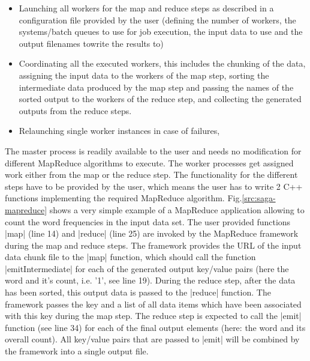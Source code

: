 \documentclass[conference,final]{IEEEtran}
\begin{document}
\begin{itemize}
\item Launching all workers for the map and reduce steps as described
  in a configuration file provided by the user (defining the number of
  workers, the systems/batch queues to use for job execution, the
  input data to use and the output filenames towrite the results to)
\item Coordinating all the executed workers, this includes the
  chunking of the data, assigning the input data to the workers of the
  map step, sorting the intermediate data produced by the map step and
  passing the names of the sorted output to
  the workers of the reduce step, and collecting the generated outputs
  from the reduce steps.
\item Relaunching single worker instances in case of failures,
\end{itemize}

The master process is readily available to the user and needs no
modification for different MapReduce algorithms to execute.  The
worker processes get assigned work either from the map or the reduce
step. The functionality for the different steps have to be provided by
the user, which means the user has to write 2 C++ functions
implementing the required MapReduce algorithm.
Fig.\ref{src:saga-mapreduce} shows a very simple example of a
MapReduce application allowing to count the word frequencies in the
input data set. The user provided functions |map| (line 14) and
|reduce| (line 25) are invoked by the MapReduce framework during the
map and reduce steps. The framework provides the URL of the input data
chunk file to the |map| function, which should call the function
|emitIntermediate| for each of the generated output key/value pairs
(here the word and it's count, i.e. '1', see line 19). During the
reduce step, after the data has been sorted, this output data is
passed to the |reduce| function. The framework passes the key and a
list of all data items which have been associated with this key during
the map step. The reduce step is expected to call the |emit| function
(see line 34) for each of the final output elements (here: the word
and its overall count). All key/value pairs that are passed to |emit|
will be combined by the framework into a single output file.
\end{document}
